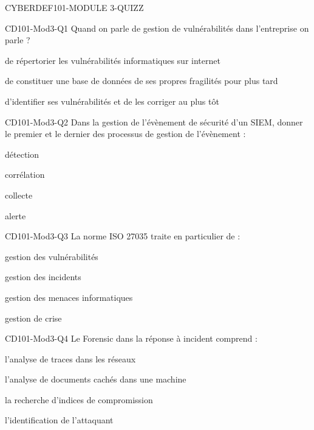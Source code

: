 \documentclass[12pt]{article}
\begin{document}
 \begin{quiz}{CYBERDEF101-MODULE 3-QUIZZ}


\begin{multi}[multiple=true]{CD101-Mod3-Q1} 
Quand on parle de gestion de vulnérabilités dans l'entreprise on parle ?
\item de répertorier les vulnérabilités informatiques sur internet
\item* de constituer une base de données de ses propres fragilités pour plus tard
\item* d'identifier ses vulnérabilités et de les corriger au plus tôt	
\end{multi}


\begin{multi}[multiple=true]{CD101-Mod3-Q2}
Dans la gestion de l'évènement de sécurité d'un SIEM, donner le premier et le dernier des processus de gestion de l'évènement :
\item* détection 
\item corrélation
\item collecte
\item* alerte
\end{multi}

\begin{multi}[multiple=true]{CD101-Mod3-Q3}
La norme ISO 27035 traite en particulier de :
\item gestion des vulnérabilités	
\item* gestion des incidents	
\item gestion des menaces informatiques
\item gestion de crise
\end{multi}	

\begin{multi}[multiple=true]{CD101-Mod3-Q4} 
Le Forensic dans la réponse à incident comprend  :
\item* l'analyse de traces dans les réseaux	
\item* l'analyse de documents cachés dans une machine
\item* la recherche d'indices de compromission
\item* l'identification de l'attaquant
\end{multi}


\end{quiz}
\end{document}
